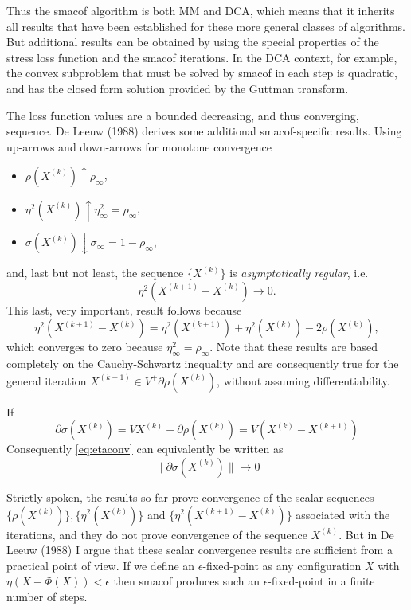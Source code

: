 \documentclass[
  12pt,
]{article}
\providecommand{\tightlist}{%
  \setlength{\itemsep}{0pt}\setlength{\parskip}{0pt}}
\begin{document}
Thus the smacof algorithm is both MM and DCA, which means that it inherits all
results that have been established for these more general classes of algorithms.
But additional results can be obtained by using the special properties of
the stress loss function and the smacof iterations. In the DCA context, for example, the convex subproblem that must be solved by smacof in each step is quadratic, and has the closed form solution provided by the Guttman transform.

The loss function values are a bounded decreasing, and thus converging, sequence. De Leeuw (1988) derives some additional smacof-specific results. Using up-arrows and down-arrows for monotone convergence

\begin{itemize}
\tightlist
\item
  \(\rho(X^{(k)})\uparrow\rho_\infty\),
\item
  \(\eta^2(X^{(k)})\uparrow\eta^2_\infty=\rho_\infty\),
\item
  \(\sigma(X^{(k)})\downarrow\sigma_\infty=1-\rho_\infty\),
\end{itemize}

and, last but not least, the sequence \(\{X^{(k)}\}\) is \emph{asymptotically regular}, i.e.
\begin{equation}
\eta^2(X^{(k+1)}-X^{(k)})\rightarrow 0.
\label{eq:etaconv}
\end{equation}
This last, very important, result follows because
\begin{equation}
\eta^2(X^{(k+1)}-X^{(k)})=\eta^2(X^{(k+1)})+\eta^2(X^{(k)})-2\rho(X^{(k)}),
\label{eq:etanull}
\end{equation}
which converges to zero because \(\eta^2_\infty=\rho_\infty\).
Note that these results are based completely on the Cauchy-Schwartz inequality and are consequently true for the general iteration \(X^{(k+1)}\in V^+\partial\rho(X^{(k)})\), without assuming differentiability.

If
\[
\partial\sigma(X^{(k)})=VX^{(k)}-\partial\rho(X^{(k)}) =V(X^{(k)}-X^{(k+1)})
\]
Consequently \eqref{eq:etaconv} can equivalently be written as
\[
\|\partial\sigma(X^{(k)})\|\rightarrow 0
\]

Strictly spoken, the results so far prove convergence of the scalar sequences
\(\{\rho(X^{(k)})\}, \{\eta^2(X^{(k)})\}\) and \(\{\eta^2(X^{(k+1)}-X^{(k)})\}\) associated
with the iterations, and they do not prove convergence of the sequence
\(X^{(k)}\). But in De Leeuw (1988) I argue that these scalar convergence results are sufficient from a practical point of view. If we define an \(\epsilon\)-fixed-point as
any configuration \(X\) with \(\eta(X-\Phi(X))<\epsilon\) then smacof produces such an
\(\epsilon\)-fixed-point in a finite number of steps.
\end{document}
